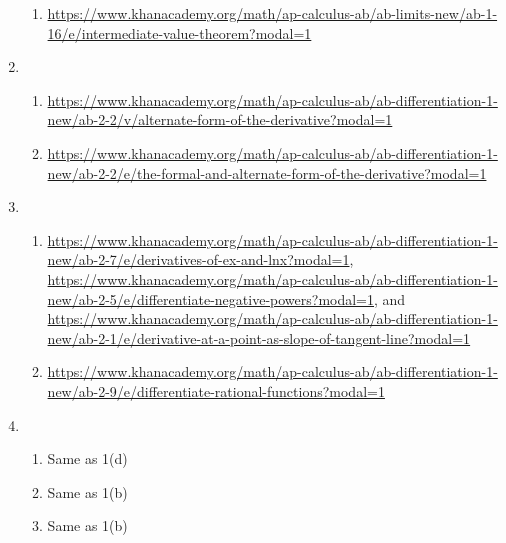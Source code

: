 \documentclass[a4paper,12pt]{article}
\begin{document}
\begin{enumerate}
\begin{enumerate}
\item \url{https://www.khanacademy.org/math/ap-calculus-ab/ab-limits-new/ab-1-16/e/intermediate-value-theorem?modal=1}
\end{enumerate}
\item \begin{enumerate}
\item \url{https://www.khanacademy.org/math/ap-calculus-ab/ab-differentiation-1-new/ab-2-2/v/alternate-form-of-the-derivative?modal=1}
\item \url{https://www.khanacademy.org/math/ap-calculus-ab/ab-differentiation-1-new/ab-2-2/e/the-formal-and-alternate-form-of-the-derivative?modal=1}
\end{enumerate}
\item \begin{enumerate}
\item \url{https://www.khanacademy.org/math/ap-calculus-ab/ab-differentiation-1-new/ab-2-7/e/derivatives-of-ex-and-lnx?modal=1}, \url{https://www.khanacademy.org/math/ap-calculus-ab/ab-differentiation-1-new/ab-2-5/e/differentiate-negative-powers?modal=1}, and \url{https://www.khanacademy.org/math/ap-calculus-ab/ab-differentiation-1-new/ab-2-1/e/derivative-at-a-point-as-slope-of-tangent-line?modal=1}
\item \url{https://www.khanacademy.org/math/ap-calculus-ab/ab-differentiation-1-new/ab-2-9/e/differentiate-rational-functions?modal=1}
\end{enumerate}
\item \begin{enumerate}
\item Same as 1(d)
\item Same as 1(b)
\item Same as 1(b)
\end{enumerate}
\end{enumerate}
\end{document}
